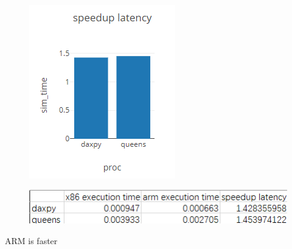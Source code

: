 \documentclass{article}
\begin{document}
\begin{figure}[H]\centering\includegraphics{7.png}\end{figure}
\begin{figure}[H]\centering\includegraphics{8.png}\end{figure}
ARM is faster
\end{document}
